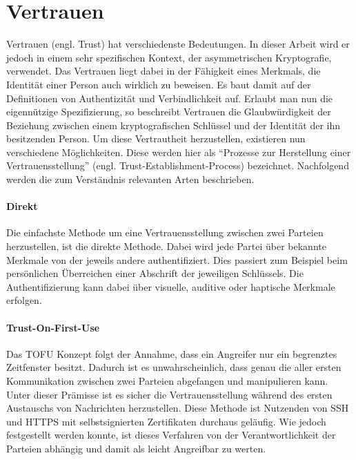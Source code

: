 \section{Vertrauen}
\label{sec:trust}
Vertrauen (engl. Trust) hat verschiedenste Bedeutungen. In dieser Arbeit wird er jedoch in einem sehr spezifischen Kontext, der asymmetrischen Kryptografie, verwendet. Das Vertrauen liegt dabei in der Fähigkeit eines Merkmals, die Identität einer Person auch wirklich zu beweisen. Es baut damit auf der Definitionen von Authentizität und Verbindlichkeit auf\cite{Perrin2010}. Erlaubt man nun die eigennützige Spezifizierung, so beschreibt Vertrauen die Glaubwürdigkeit der Beziehung zwischen einem kryptografischen Schlüssel und der Identität der ihn besitzenden Person. Um diese Vertrautheit herzustellen, existieren nun verschiedene Möglichkeiten. Diese werden hier als ``Prozesse zur Herstellung einer Vertrauensstellung'' (engl. Trust-Establishment-Process) bezeichnet. Nachfolgend werden die zum Verständnis relevanten Arten beschrieben.

\paragraph{Direkt}
Die einfachste Methode um eine Vertrauensstellung zwischen zwei Parteien herzustellen, ist die direkte Methode. Dabei wird jede Partei über bekannte Merkmale von der jeweils andere authentifiziert. Dies passiert zum Beispiel beim persönlichen Überreichen einer Abschrift der jeweiligen Schlüssels. Die Authentifizierung kann dabei über visuelle, auditive oder haptische Merkmale erfolgen.

\paragraph{Trust-On-First-Use}
Das \ac{TOFU} Konzept folgt der Annahme, dass ein Angreifer nur ein begrenztes Zeitfenster besitzt. Dadurch ist es unwahrscheinlich, dass genau die aller ersten Kommunikation zwischen zwei Parteien abgefangen und manipulieren kann. Unter dieser Prämisse ist es sicher die Vertrauensstellung während des ersten Austauschs von Nachrichten herzustellen. Diese Methode ist Nutzenden von \ac{SSH} und \acs{HTTPS} mit selbstsignierten Zertifikaten durchaus geläufig. Wie jedoch festgestellt werden konnte, ist dieses Verfahren von der Verantwortlichkeit der Parteien abhängig und damit als leicht Angreifbar zu werten\cite{Wendlandt2008}.

